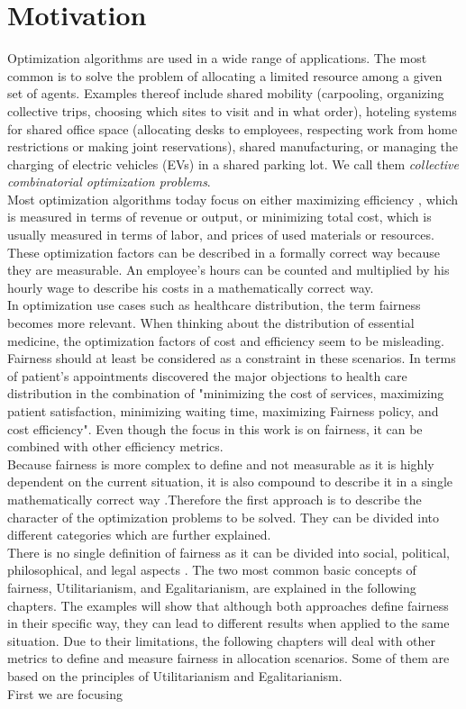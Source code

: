 \documentclass[german, a4paper, 11pt, oneside]{scrbook}
\begin{document}
\chapter{Motivation}
\label{sec:motivation}
Optimization algorithms are used in a wide range of applications. The most common is to solve the problem of allocating a limited resource among a given set of agents.  Examples thereof include shared mobility (carpooling, organizing collective trips, choosing which sites to visit and in what order), hoteling systems for shared office space (allocating desks to employees, respecting work from home restrictions or making joint reservations), shared manufacturing, or managing the charging of electric vehicles (EVs) in a shared parking lot. We call them \emph{collective combinatorial optimization problems}. \\
Most optimization algorithms today focus on either maximizing efficiency \cite{Foulds.7222018}, which is measured in terms of revenue or output, or minimizing total cost, which is usually measured in terms of labor, and prices of used materials or resources. \cite{XinyingChen.2023, .} These optimization factors can be described in a formally correct way because they are measurable. An employee's hours can be counted and multiplied by his hourly wage to describe his costs in a mathematically correct way. \\In optimization use cases such as healthcare distribution, the term fairness becomes more relevant. When thinking about the distribution of essential medicine, the optimization factors of cost and efficiency seem to be misleading. Fairness should at least be considered as a constraint in these scenarios. In terms of patient's appointments \cite{Ala.2021} discovered the major objections to health care distribution in the combination of "minimizing the cost of services, maximizing patient satisfaction, minimizing waiting time, maximizing Fairness policy, and cost efficiency". \cite{Ala.2021} Even though the focus in this work is on fairness, it can be combined with other efficiency metrics.\\ Because fairness is more complex to define and not measurable as it is highly dependent on the current situation, it is also compound to describe it in a single mathematically correct way \cite{Binns.}.Therefore the first approach is to describe the character of the optimization problems to be solved. They can be divided into different categories which are further explained. \\ There is no single definition of fairness as it can be divided into social, political, philosophical, and legal aspects \cite{Foulds.7222018}. The two most common basic concepts of fairness, Utilitarianism, and Egalitarianism, are explained in the following chapters. The examples will show that although both approaches define fairness in their specific way, they can lead to different results when applied to the same situation. \cite{Yu.7222022} Due to their limitations, the following chapters will deal with other metrics to define and measure fairness in allocation scenarios. Some of them are based on the principles of Utilitarianism and Egalitarianism. \\ First we are focusing 
\end{document}
